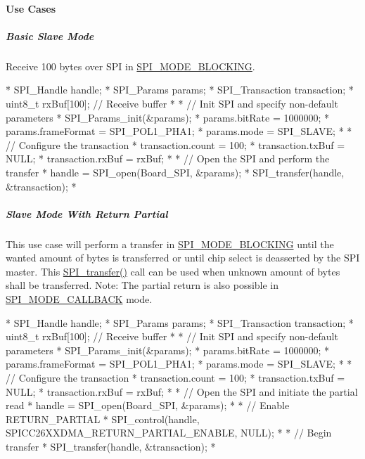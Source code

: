 \paragraph*{Use Cases\label{_s_p_i_c_c26_x_x_d_m_a_8h_USE_CASES_SPI}%
\hypertarget{_s_p_i_c_c26_x_x_d_m_a_8h_USE_CASES_SPI}{}%
}

\subparagraph*{Basic Slave Mode}

Receive 100 bytes over S\-P\-I in \hyperlink{_s_p_i_8h_ab9ea76c6529d6076eee5e1c4a5a92c6fa0dfb2358e008316426895e7237c398e8}{S\-P\-I\-\_\-\-M\-O\-D\-E\-\_\-\-B\-L\-O\-C\-K\-I\-N\-G}. 
\begin{DoxyCode}
*  SPI_Handle handle;
*  SPI_Params params;
*  SPI_Transaction transaction;
*  uint8\_t rxBuf[100];     \textcolor{comment}{// Receive buffer}
*
*  \textcolor{comment}{// Init SPI and specify non-default parameters}
*  SPI_Params_init(&params);
*  params.bitRate     = 1000000;
*  params.frameFormat = SPI_POL1_PHA1;
*  params.mode        = SPI_SLAVE;
*
*  \textcolor{comment}{// Configure the transaction}
*  transaction.count = 100;
*  transaction.txBuf = NULL;
*  transaction.rxBuf = rxBuf;
*
*  \textcolor{comment}{// Open the SPI and perform the transfer}
*  handle = SPI_open(Board\_SPI, &params);
*  SPI_transfer(handle, &transaction);
*  
\end{DoxyCode}


\subparagraph*{Slave Mode With Return Partial\label{_s_p_i_c_c26_x_x_d_m_a_8h_USE_CASE_RP}%
\hypertarget{_s_p_i_c_c26_x_x_d_m_a_8h_USE_CASE_RP}{}%
}

This use case will perform a transfer in \hyperlink{_s_p_i_8h_ab9ea76c6529d6076eee5e1c4a5a92c6fa0dfb2358e008316426895e7237c398e8}{S\-P\-I\-\_\-\-M\-O\-D\-E\-\_\-\-B\-L\-O\-C\-K\-I\-N\-G} until the wanted amount of bytes is transferred or until chip select is deasserted by the S\-P\-I master. This \hyperlink{_s_p_i_8h_a989e17f96b54fcc3dc2cac5f8ac6bdb2}{S\-P\-I\-\_\-transfer()} call can be used when unknown amount of bytes shall be transferred. Note\-: The partial return is also possible in \hyperlink{_s_p_i_8h_ab9ea76c6529d6076eee5e1c4a5a92c6fa5631e69925c47a62a261c78ebbda39fb}{S\-P\-I\-\_\-\-M\-O\-D\-E\-\_\-\-C\-A\-L\-L\-B\-A\-C\-K} mode. 
\begin{DoxyCode}
*  SPI_Handle handle;
*  SPI_Params params;
*  SPI_Transaction transaction;
*  uint8\_t rxBuf[100];     \textcolor{comment}{// Receive buffer}
*
*  \textcolor{comment}{// Init SPI and specify non-default parameters}
*  SPI_Params_init(&params);
*  params.bitRate     = 1000000;
*  params.frameFormat = SPI_POL1_PHA1;
*  params.mode        = SPI_SLAVE;
*
*  \textcolor{comment}{// Configure the transaction}
*  transaction.count = 100;
*  transaction.txBuf = NULL;
*  transaction.rxBuf = rxBuf;
*
*  \textcolor{comment}{// Open the SPI and initiate the partial read}
*  handle = SPI_open(Board\_SPI, &params);
*
*  \textcolor{comment}{// Enable RETURN\_PARTIAL}
*  SPI_control(handle, SPICC26XXDMA_RETURN_PARTIAL_ENABLE, NULL);
*
*  \textcolor{comment}{// Begin transfer}
*  SPI_transfer(handle, &transaction);
*  
\end{DoxyCode}


